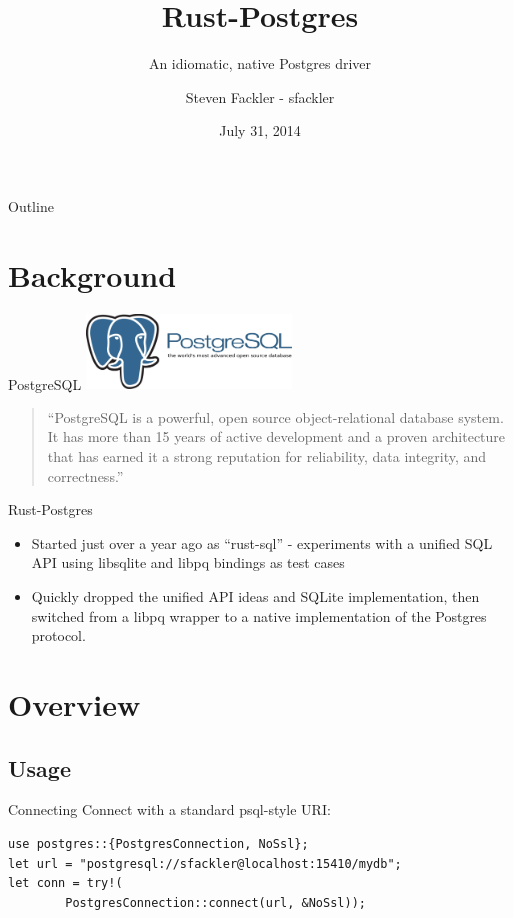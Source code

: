 \documentclass{beamer}
\title{Rust-Postgres}
\subtitle{An idiomatic, native Postgres driver}
\author[sfackler]{Steven Fackler - sfackler}
\date{July 31, 2014}
\begin{document}
\begin{frame}
\titlepage
\end{frame}

\begin{frame}{Outline}
    \tableofcontents
\end{frame}

\section{Background}

\begin{frame}{PostgreSQL}
	\includegraphics[height=2cm]{postgres_logo.pdf}

	\begin{quote}
		``PostgreSQL is a powerful, open source object-relational database system. It has more than 15 years of active development and a proven architecture that has earned it a strong reputation for reliability, data integrity, and correctness.''
	\end{quote}
\end{frame}

\begin{frame}{Rust-Postgres}
    \begin{itemize}
        \item Started just over a year ago as ``rust-sql'' - experiments with a unified SQL API using libsqlite and libpq bindings as test cases
        \item Quickly dropped the unified API ideas and SQLite implementation, then switched from a libpq wrapper to a native implementation of the Postgres protocol.
    \end{itemize}
\end{frame}

\section{Overview}
\subsection{Usage}

\begin{frame}[fragile]{Connecting}
	Connect with a standard psql-style URI:
	\begin{verbatim}
use postgres::{PostgresConnection, NoSsl};
let url = "postgresql://sfackler@localhost:15410/mydb";
let conn = try!(
        PostgresConnection::connect(url, &NoSsl));
	\end{verbatim}	
\end{frame}
\end{document}
